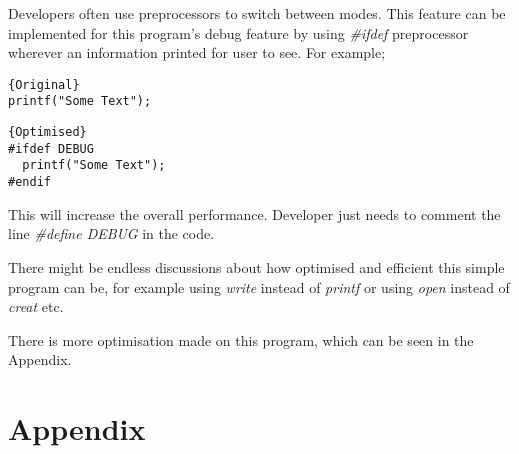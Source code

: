 \documentclass[11pt]{article}
\begin{document}
Developers often use preprocessors to switch between modes. This feature can be implemented for this program's debug feature by using \textit{\#ifdef} preprocessor wherever an information printed for user to see. For example;

\noindent\begin{minipage}{.45\textwidth}
\begin{lstlisting}[caption=Original,frame=tlrb]{Original}
printf("Some Text");
\end{lstlisting}
\end{minipage}\hfill
\begin{minipage}{.50\textwidth}
\begin{lstlisting}[caption=Optimised,frame=tlrb]{Optimised}
#ifdef DEBUG
  printf("Some Text");
#endif
\end{lstlisting}
\end{minipage}
This will increase the overall performance. Developer just needs to comment the line \textit{\#define DEBUG} in the code.

There might be endless discussions about how optimised and efficient this simple program can be, for example using \textit{write} instead of \textit{printf} or using \textit{open} instead of \textit{creat} etc. 

There is more optimisation made on this program, which can be seen in the Appendix.
\newpage

\section*{Appendix}
\end{document}
